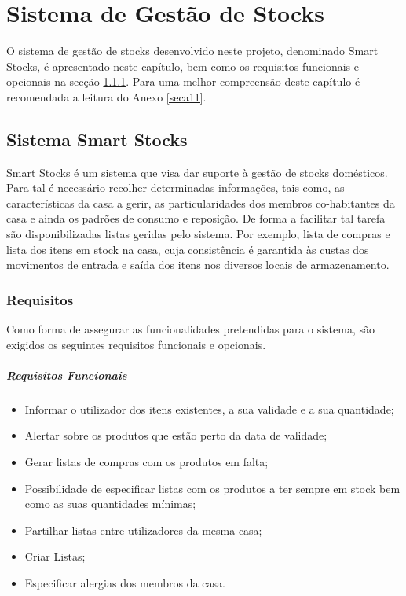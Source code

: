 %
%
\chapter{Sistema de Gestão de Stocks} \label{cap2}

O sistema de gestão de stocks desenvolvido neste projeto, denominado Smart Stocks, é apresentado neste capítulo, bem como os requisitos funcionais e opcionais na secção \ref{subsec211}. Para uma melhor compreensão deste capítulo é recomendada a leitura do Anexo \ref{seca11}.

%
%
\section{Sistema Smart Stocks} \label{sec21}
Smart Stocks é um sistema que visa dar suporte à gestão de stocks domésticos. Para tal é necessário recolher determinadas informações, tais como, as características da casa a gerir, as particularidades dos membros co-habitantes da casa e ainda os padrões de consumo e reposição. De forma a facilitar tal tarefa são disponibilizadas listas geridas pelo sistema. Por exemplo, lista de compras e lista dos itens em stock na casa, cuja consistência é garantida às custas dos movimentos de entrada e saída dos itens nos diversos locais de armazenamento.

%
%
\subsection{Requisitos} \label{subsec211}
Como forma de assegurar as funcionalidades pretendidas para o sistema, são exigidos os seguintes requisitos funcionais e opcionais.

\paragraph{Requisitos Funcionais}
\begin{itemize}
	\item Informar o utilizador dos itens existentes, a sua validade e a sua quantidade;
	\item Alertar sobre os produtos que estão perto da data de validade;
	\item Gerar listas de compras com os produtos em falta;
	\item Possibilidade de especificar listas com os produtos a ter sempre em stock bem como as suas quantidades mínimas;
	\item Partilhar listas entre utilizadores da mesma casa;
	\item Criar Listas;
	\item Especificar alergias dos membros da casa.
\end{itemize}


